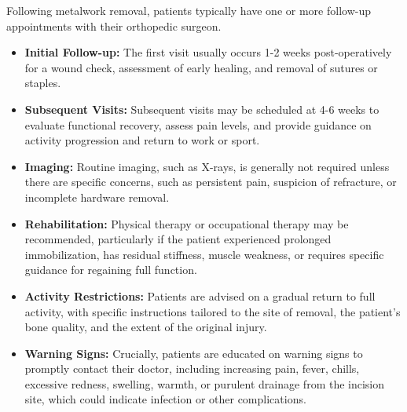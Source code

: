 Following metalwork removal, patients typically have one or more follow-up appointments with their orthopedic surgeon.

\begin{itemize}
  \item \textbf{Initial Follow-up:} The first visit usually occurs 1-2 weeks post-operatively for a wound check, assessment of early healing, and removal of sutures or staples.
  \item \textbf{Subsequent Visits:} Subsequent visits may be scheduled at 4-6 weeks to evaluate functional recovery, assess pain levels, and provide guidance on activity progression and return to work or sport.
  \item \textbf{Imaging:} Routine imaging, such as X-rays, is generally not required unless there are specific concerns, such as persistent pain, suspicion of refracture, or incomplete hardware removal.
  \item \textbf{Rehabilitation:} Physical therapy or occupational therapy may be recommended, particularly if the patient experienced prolonged immobilization, has residual stiffness, muscle weakness, or requires specific guidance for regaining full function.
  \item \textbf{Activity Restrictions:} Patients are advised on a gradual return to full activity, with specific instructions tailored to the site of removal, the patient's bone quality, and the extent of the original injury.
  \item \textbf{Warning Signs:} Crucially, patients are educated on warning signs to promptly contact their doctor, including increasing pain, fever, chills, excessive redness, swelling, warmth, or purulent drainage from the incision site, which could indicate infection or other complications.
\end{itemize}

